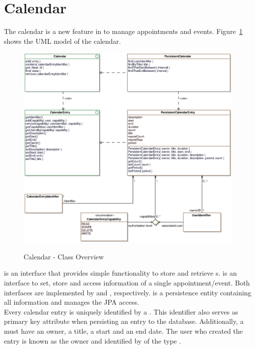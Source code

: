 \section{Calendar}
\label{sec:calendar}

The calendar is a new feature in \salespoint{} to manage appointments and events.
Figure~\ref{calendar_overview} shows the UML model of the calendar.

\begin{figure}[ht]
	\centering
  \includegraphics[width=1.0\textwidth]{images/Calendar_Overview.eps}
	\label{calendar_overview}
	\caption{Calendar - Class Overview}
\end{figure}

 is an interface that provides simple functionality to store and retrieve s.
 is an interface to set, store and access information of a single appointment/event.
Both interfaces are implemented by  and , respectively.
 is a persistence entity containing all information and  manages the JPA access.
\\

Every calendar entry is uniquely identified by a .
This identifier also serves as primary key attribute when persisting an entry to the database.
Additionally, a  must have an owner, a title, a start and an end date.
The user who created the entry is known as the owner and identified by  of the type .
\\

